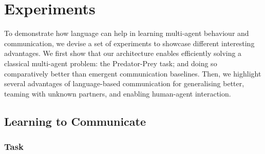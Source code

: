 














\section{Experiments}\label{sec:LAMAC:Experiments}

To demonstrate how language can help in learning multi-agent behaviour and communication, we devise a set of experiments to showcase different interesting advantages. We first show that our architecture enables efficiently solving a classical multi-agent problem: the Predator-Prey task; and doing so comparatively better than emergent communication baselines. Then, we highlight several advantages of language-based communication for generalising better, teaming with unknown partners, and enabling human-agent interaction. 

\subsection{Learning to Communicate}\label{sec:LAMAC:Exp_Training}

\subsubsection{Task}

